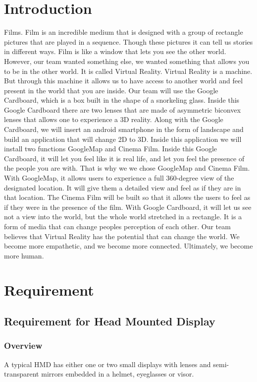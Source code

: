 \documentclass[12pt]{article}
\begin{document}
\section{Introduction}

Films. Film is an incredible medium that is designed with a group of rectangle pictures that are played in a sequence. Though these pictures it can tell us stories in different ways. Film is like a window that lets you see the other world. However, our team wanted something else, we wanted something that allows you to be in the other world. It is called Virtual Reality.  Virtual Reality is a machine. But through this machine it allows us to have access to another world and feel present in the world that you are inside. Our team will use the Google Cardboard, which is a box built in the shape of a snorkeling glass. Inside this Google Cardboard there are two lenses that are made of asymmetric biconvex lenses that allows one to experience a 3D reality. Along with the Google Cardboard, we will insert an android smartphone in the form of landscape and build an application that will change 2D to 3D. Inside this application we will install two functions GoogleMap and Cinema Film.   Inside this Google Cardboard, it will let you feel like it is real life, and let you feel the presence of the people you are with. That is why we we chose GoogleMap and Cinema Film. With GoogleMap, it allows users to experience a full 360-degree view of the designated location. It will give them a detailed view and feel as if they are in that location. The Cinema Film will be built so that it allows the users to feel as if they were in the presence of the film.   With Google Cardboard, it will let us see not a view into the world, but the whole world stretched in a rectangle. It is a form of media that can change peoples perception of each other. Our team believes that Virtual Reality has the potential that can change the world. We become more empathetic, and we become more connected. Ultimately, we become more human.

\section{Requirement}
\subsection {Requirement for Head Mounted Display}

\subsubsection{Overview}
A typical HMD has either one or two small displays with lenses and semi-transparent mirrors embedded in a helmet, eyeglasses or visor.
\end{document}
